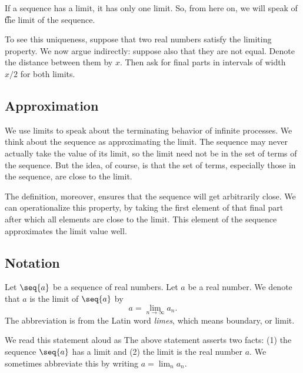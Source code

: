 If a sequence has a limit, it has only one limit.
So, from here on, we will speak of \t{the limit} of the sequence.

To see this uniqueness, suppose that two real numbers satisfy the limiting property.
We now argue indirectly: suppose also that they are not equal.
Denote the distance between them by $x$.
Then ask for final parts in intervals of width $x/2$ for both limits.

\subsection*{Approximation}

We use limits to speak about the terminating behavior of infinite processes.
We think about the sequence as approximating the limit.
The sequence may never actually take the value of its limit, so the limit need not be in the set of terms of the sequence.
But the idea, of course, is that the set of terms, especially those  in the sequence, are close to the limit.

The definition, moreover, ensures that the sequence will get arbitrarily close.
We can operationalize this property, by taking the first element of that final part after which all elements are close to the limit.
This element of the sequence approximates the limit value well.

\subsection*{Notation}

Let $\seq{a}$ be a sequence of real numbers.
Let $a$ be a real number.
We denote that $a$ is the limit of $\seq{a}$ by
  \[
a = \lim_{n \to \infty} a_n.
  \]
The abbreviation  is from the Latin word \textit{limes}, which means boundary, or limit.

We read this statement aloud as 
The above statement asserts two facts: (1) the sequence $\seq{a}$ has a limit and (2) the limit is the real number $a$.
We sometimes abbreviate this by writing
$a = \lim_{n} a_n$.
